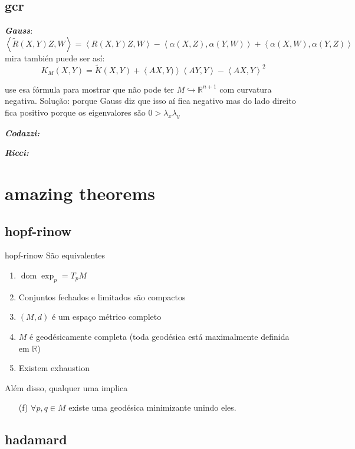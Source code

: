 \subsection{gcr}
\textit{\textbf{Gauss}}:
\[\left<\tilde{R}(X,Y)Z,W\right>=\left<R(X,Y)Z,W\right>-\left<\alpha(X,Z),\alpha(Y,W)\right>+\left<\alpha(X,W),\alpha(Y,Z)\right>\]
mira también puede ser así:
\[K_M(X,Y)=\tilde{K}(X,Y)+\left<AX,Y)\right>\left<AY,Y\right>-\left<AX,Y\right>^2\]
\begin{exercise}\leavevmode
use esa fórmula para mostrar que não pode ter \(M \hookrightarrow \mathbb{R}^{n+1}\) com curvatura negativa. Solução: porque Gauss diz que isso aí fica negativo mas do lado direito fica positivo porque os eigenvalores são \(0>\lambda_x\lambda_y\)
\end{exercise}

\textit{\textbf{Codazzi:}}

 \textit{\textbf{Ricci:}}

\section{amazing theorems}

\subsection{hopf-rinow}
\begin{thing6}{hopf-rinow}\leavevmode
São equivalentes
\begin{enumerate}[label=(\alph*)]
\item \(\operatorname{dom}\operatorname{exp}_p=T_pM\) 
\item Conjuntos fechados e limitados são compactos
\item \((M,d)\) é um espaço métrico completo
\item \(M\) é geodésicamente completa (toda geodésica está maximalmente definida em \(\mathbb{R}\))
\item Existem exhaustion
\end{enumerate}
Além disso, qualquer uma implica
\begin{enumerate}[label=(\alph*)]
	\item[(f)] \(\forall p,q \in M\) existe uma geodésica minimizante unindo eles.
\end{enumerate}
\end{thing6}

\subsection{hadamard}

